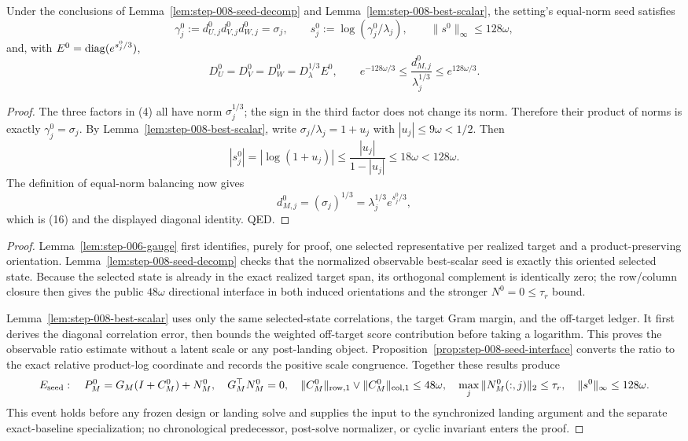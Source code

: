 \begin{proposition}\label{prop:step-008-seed-interface}
Under the conclusions of Lemma~\ref{lem:step-008-seed-decomp} and
Lemma~\ref{lem:step-008-best-scalar}, the
setting's equal-norm seed satisfies
\[
 \gamma_j^0:=d_{U,j}^0d_{V,j}^0d_{W,j}^0=\sigma_j,\qquad
 s_j^0:=\log(\gamma_j^0/\lambda_j),\qquad
 \|s^0\|_\infty\le128\omega, \tag{15}
\]
and, with $E^0={\rm diag}(e^{s_j^0/3})$,
\[
 D_U^0=D_V^0=D_W^0=D_\lambda^{1/3}E^0,\qquad
 e^{-128\omega/3}\le\frac{d_{M,j}^0}{\lambda_j^{1/3}}
 \le e^{128\omega/3}. \tag{16}
\]

\begin{proof}

The three factors in (4) all have norm $\sigma_j^{1/3}$; the sign in the
third factor does not change its norm. Therefore their product of norms is
exactly $\gamma_j^0=\sigma_j$. By Lemma~\ref{lem:step-008-best-scalar}, write
$\sigma_j/\lambda_j=1+u_j$ with $|u_j|\le9\omega<1/2$. Then
\[
 |s_j^0|=|\log(1+u_j)|
 \le\frac{|u_j|}{1-|u_j|}
 \le18\omega<128\omega. \tag{17}
\]
The definition of equal-norm balancing now gives
\[
 d_{M,j}^0=(\sigma_j)^{1/3}
 =\lambda_j^{1/3}e^{s_j^0/3},
\]
which is (16) and the displayed diagonal identity. QED.

\end{proof}
\end{proposition}
\begin{proof}
Lemma~\ref{lem:step-006-gauge} first identifies, purely for proof,
one selected representative per realized target and a product-preserving
orientation. Lemma~\ref{lem:step-008-seed-decomp} checks that the normalized
observable best-scalar seed is exactly this oriented selected state. Because
the selected state is already in the exact realized target span, its
orthogonal complement is identically zero; the row/column closure
then gives the public $48\omega$ directional interface in both induced
orientations and the stronger $N^0=0\le\tau_r$ bound.

Lemma~\ref{lem:step-008-best-scalar} uses only the same selected-state correlations,
the target Gram margin, and the off-target ledger. It first derives
the diagonal correlation error, then bounds the weighted off-target score
contribution before taking a logarithm. This proves the observable ratio
estimate without a latent scale or any post-landing object.
Proposition~\ref{prop:step-008-seed-interface} converts the ratio to the exact relative
product-log coordinate and records the positive scale congruence. Together
these results produce
\[
 E_{\rm seed}:\quad
 P_M^0=G_M(I+C_M^0)+N_M^0,\quad G_M^\top N_M^0=0,\quad
 \|C_M^0\|_{\rm row,1}\vee\|C_M^0\|_{\rm col,1}\le48\omega,\quad
 \max_j\|N_M^0(:,j)\|_2\le\tau_r,\quad
 \|s^0\|_\infty\le128\omega.
\]
This event holds before any frozen design or landing solve and supplies the
input to the synchronized landing argument and the separate exact-baseline
specialization; no chronological predecessor, post-solve normalizer, or
cyclic invariant enters the proof.
\end{proof}

